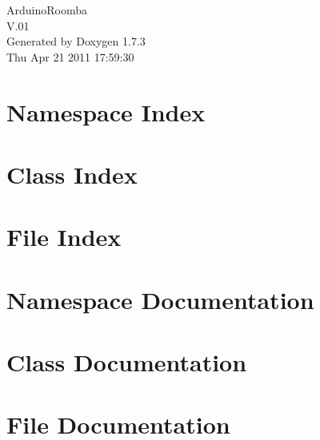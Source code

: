 \documentclass[a4paper]{book}
\begin{document}
\hypersetup{pageanchor=false}
\begin{titlepage}
\vspace*{7cm}
\begin{center}
{\Large ArduinoRoomba \\[1ex]\large V.01 }\\
\vspace*{1cm}
{\large Generated by Doxygen 1.7.3}\\
\vspace*{0.5cm}
{\small Thu Apr 21 2011 17:59:30}\\
\end{center}
\end{titlepage}
\clearemptydoublepage
{}
\tableofcontents
\clearemptydoublepage
{}
\hypersetup{pageanchor=true}
\chapter{Namespace Index}

\chapter{Class Index}

\chapter{File Index}

\chapter{Namespace Documentation}






\chapter{Class Documentation}

\chapter{File Documentation}





\printindex
\end{document}
